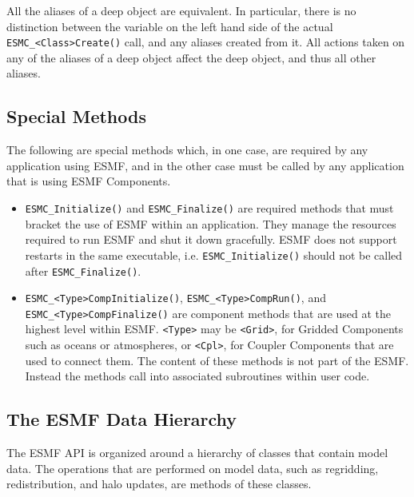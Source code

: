 All the aliases of a deep object are equivalent. In particular, there is no
distinction between the variable on the left hand side of the actual
{\tt ESMC\_<Class>Create()} call, and any aliases created from it. All actions
taken on any of the aliases of a deep object affect the deep object, and thus
all other aliases.

\subsection{Special Methods}

The following are special methods which, in one case,
are required by any application using ESMF, and in the 
other case must be called by any application that is using 
ESMF Components.

\begin{itemize}

\item {\tt ESMC\_Initialize()} and {\tt ESMC\_Finalize()} are required 
methods that must bracket the use of ESMF within an application.  
They manage the resources required to run ESMF and shut it down
gracefully.  ESMF does not support restarts in the same executable, i.e.
{\tt ESMC\_Initialize()} should not be called after {\tt ESMC\_Finalize()}.
\item {\tt ESMC\_<Type>CompInitialize()}, {\tt ESMC\_<Type>CompRun()}, and 
{\tt ESMC\_<Type>CompFinalize()} are component methods that are used at the 
highest level within ESMF.  {\tt <Type>} may be {\tt <Grid>}, for 
Gridded Components such as oceans or atmospheres, or
{\tt <Cpl>}, for Coupler Components that are used to connect 
them.  The content of these methods is not part of the ESMF.  
Instead the methods call into associated subroutines within 
user code.

\end{itemize}

\subsection{The ESMF Data Hierarchy}

The ESMF API is organized around a hierarchy of classes that
contain model data.  The operations that are performed
on model data, such as regridding, redistribution, and halo 
updates, are methods of these classes.  

